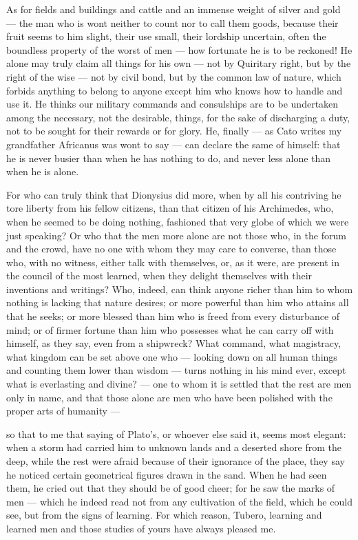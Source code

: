  As for fields and buildings and cattle and an immense weight of silver and gold --- the man who is wont neither to count nor to call them goods, because their fruit seems to him slight, their use small, their lordship uncertain, often the boundless property of the worst of men --- how fortunate he is to be reckoned! He alone may truly claim all things for his own --- not by Quiritary right, but by the right of the wise --- not by civil bond, but by the common law of nature, which forbids anything to belong to anyone except him who knows how to handle and use it. He thinks our military commands and consulships are to be undertaken among the necessary, not the desirable, things, for the sake of discharging a duty, not to be sought for their rewards or for glory. He, finally --- as Cato writes my grandfather Africanus was wont to say --- can declare the same of himself: that he is never busier than when he has nothing to do, and never less alone than when he is alone.

 For who can truly think that Dionysius did more, when by all his contriving he tore liberty from his fellow citizens, than that citizen of his Archimedes, who, when he seemed to be doing nothing, fashioned that very globe of which we were just speaking? Or who that the men more alone are not those who, in the forum and the crowd, have no one with whom they may care to converse, than those who, with no witness, either talk with themselves, or, as it were, are present in the council of the most learned, when they delight themselves with their inventions and writings? Who, indeed, can think anyone richer than him to whom nothing is lacking that nature desires; or more powerful than him who attains all that he seeks; or more blessed than him who is freed from every disturbance of mind; or of firmer fortune than him who possesses what he can carry off with himself, as they say, even from a shipwreck? What command, what magistracy, what kingdom can be set above one who --- looking down on all human things and counting them lower than wisdom --- turns nothing in his mind ever, except what is everlasting and divine? --- one to whom it is settled that the rest are men only in name, and that those alone are men who have been polished with the proper arts of humanity ---

 so that to me that saying of Plato's, or whoever else said it, seems most elegant: when a storm had carried him to unknown lands and a deserted shore from the deep, while the rest were afraid because of their ignorance of the place, they say he noticed certain geometrical figures drawn in the sand. When he had seen them, he cried out that they should be of good cheer; for he saw the marks of men --- which he indeed read not from any cultivation of the field, which he could see, but from the signs of learning. For which reason, Tubero, learning and learned men and those studies of yours have always pleased me.

